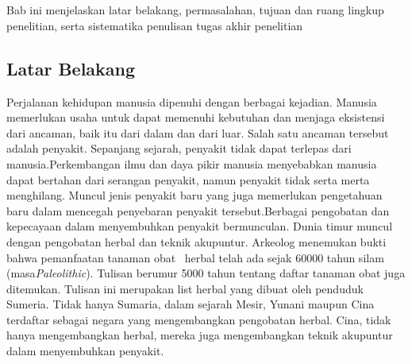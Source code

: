 
\chapter{\babSatu}
Bab ini menjelaskan latar belakang, permasalahan, tujuan dan ruang lingkup 
penelitian, serta sistematika penulisan tugas akhir penelitian 

\section{Latar Belakang}

\hspace{0.5 cm}Perjalanan kehidupan manusia dipenuhi dengan berbagai kejadian. Manusia memerlukan usaha untuk dapat memenuhi kebutuhan dan menjaga eksistensi dari ancaman, baik itu dari dalam dan dari luar. Salah satu ancaman tersebut adalah penyakit. Sepanjang sejarah, penyakit tidak dapat terlepas dari manusia.Perkembangan ilmu dan daya pikir manusia menyebabkan manusia dapat bertahan dari serangan penyakit, namun penyakit tidak serta merta menghilang. Muncul jenis penyakit baru yang juga memerlukan pengetahuan baru dalam mencegah penyebaran penyakit tersebut.Berbagai pengobatan dan kepecayaan dalam menyembuhkan penyakit bermunculan. Dunia timur muncul dengan pengobatan herbal dan teknik akupuntur. Arkeolog menemukan bukti bahwa pemanfaatan tanaman obat \ herbal telah ada sejak 60000 tahun silam (masa\textit{Paleolithic}). Tulisan berumur 5000 tahun tentang daftar tanaman obat juga ditemukan. Tulisan ini merupakan list herbal yang dibuat oleh penduduk Sumeria. Tidak hanya Sumaria, dalam sejarah Mesir, Yunani maupun Cina terdaftar sebagai negara yang mengembangkan pengobatan herbal. Cina, tidak hanya mengembangkan herbal, mereka juga mengembangkan teknik akupuntur dalam menyembuhkan penyakit.

